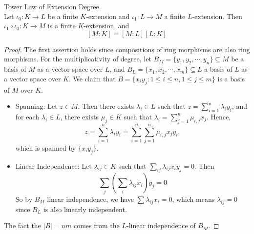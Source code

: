 \documentclass[../book.tex]{subfiles}
\begin{document}



\begin{thm} Tower Law of Extension Degree. \\
Let $\iota_0 : K \to L$ be a finite $K$-extension and 
$\iota_1 : L \to M$ a finite $L$-extension.
Then $\iota_1 \circ \iota_0 : K \to M$ is a finite $K$-extension, and 
\[
    [M : K]=[M : L][L : K]
\]
\end{thm}
\begin{proof}
The first assertion holds since compositions 
of ring morphisms are also ring morphisms. 
For the multiplicativity of degree, 
let $B_M=\{y_1,y_2,\cdots,y_n\} \subseteq M$ be a basis of $M$ 
as a vector space over $L$, 
and $B_L=\{x_1,x_2,\cdots,x_m\} \subseteq L$ a basis of $L$ 
as a vector space over $K$.
We claim that $B = \{x_iy_j:1 \leq i \leq n, 1\leq j \leq m\}$ 
is a basis of $M$ over $K$.

\begin{itemize}
    \item Spanning: 
        Let $z \in M$. 
        Then there exists $\lambda_i \in L$ such that     $z=\displaystyle\sum_{i=1}^{n} \lambda_iy_i$, 
        and for each $\lambda_i \in L$, there exists $\mu_j \in K$ 
        such that $\lambda_i=\displaystyle\sum_{j=1}^{n} \mu_{i,j} x_j$. 
        Hence,\[
            z = \sum_{i=1}^{n} \lambda_iy_i = 
            \sum_{i=1}^{n} \sum_{j=1}^{n} \mu_{i,j} x_j y_i,
        \]
        which is spanned by $\{x_iy_j\}$.
    \item Linear Independence: 
        Let $\lambda_{ij} \in K$ such that 
        $\displaystyle\sum_{ij}\lambda_{ij} x_iy_j=0$. 
        Then \[\sum_j(\sum_i \lambda_{ij} x_i)y_j=0\]
        So by $B_M$ linear independence, 
        we have $\sum \lambda_{ij}x_i=0$, 
        which means $\lambda_{ij}=0$ 
        since $B_L$ is also linearly independent.
\end{itemize}
The fact the $|B| = nm$ comes from the $L$-linear independence of $B_M$. 
\end{proof}
\end{document}
